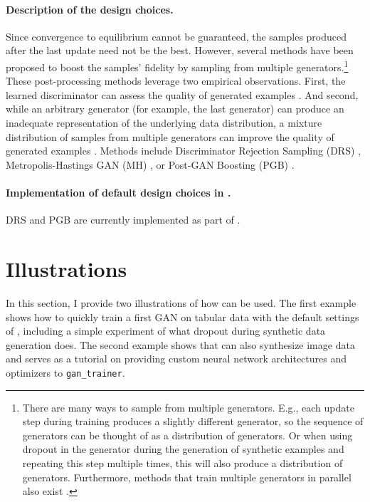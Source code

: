 \paragraph{Description of the design choices.}\label{description-of-the-design-choices.-5}

Since convergence to equilibrium cannot be guaranteed, the samples produced after the last update need not be the best. However, several methods have been proposed to boost the samples' fidelity by sampling from multiple generators.\footnote{There are many ways to sample from multiple generators. E.g., each
  update step during training produces a slightly different generator,
  so the sequence of generators can be thought of as a distribution of
  generators. Or when using dropout in the generator during the
  generation of synthetic examples and repeating this step multiple
  times, this will also produce a distribution of generators.
  Furthermore, methods that train multiple generators in parallel
  also exist \citep[e.g.,][]{mixgan, hoang2018mgan}.} These post-processing methods leverage two empirical observations. First, the learned discriminator can assess the quality of generated examples \citep{azadi2018discriminator}. And second, while an arbitrary generator (for example, the last generator) can produce an inadequate representation of the underlying data distribution, a mixture distribution of samples from multiple generators can improve the quality of generated examples \citep[see, e.g.,][]{medical, neunhoeffer2021private}. Methods include Discriminator Rejection Sampling (DRS) \citep{azadi2018discriminator}, Metropolis-Hastings GAN (MH) \citep{turner2019}, or Post-GAN Boosting (PGB) \citep{neunhoeffer2021private}.

\paragraph{\texorpdfstring{Implementation of default design choices in .}{Implementation of default design choices in .}}\label{implementation-of-default-design-choices-in-.-5}

DRS and PGB are currently implemented as part of .

\section{Illustrations}\label{sec:illustrations}

In this section, I provide two illustrations of how  can be used. The first example shows how to quickly train a first GAN on tabular data with the default settings of , including a simple experiment of what dropout during synthetic data generation does. The second example shows that  can also synthesize image data and serves as a tutorial on providing custom neural network architectures and optimizers to \texttt{gan\_trainer}.

